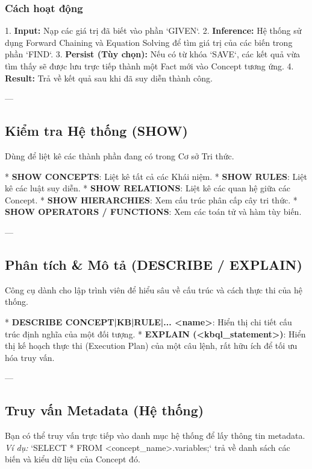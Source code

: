 \subsubsection{Cách hoạt động}
1.  \textbf{Input:} Nạp các giá trị đã biết vào phần `GIVEN`.
2.  \textbf{Inference:} Hệ thống sử dụng Forward Chaining và Equation Solving để tìm giá trị của các biến trong phần `FIND`.
3.  \textbf{Persist (Tùy chọn):} Nếu có từ khóa `SAVE`, các kết quả vừa tìm thấy sẽ được lưu trực tiếp thành một Fact mới vào Concept tương ứng.
4.  \textbf{Result:} Trả về kết quả sau khi đã suy diễn thành công.

---

\subsection{Kiểm tra Hệ thống (SHOW)}

Dùng để liệt kê các thành phần đang có trong Cơ sở Tri thức.

*   \textbf{SHOW CONCEPTS}: Liệt kê tất cả các Khái niệm.
*   \textbf{SHOW RULES}: Liệt kê các luật suy diễn.
*   \textbf{SHOW RELATIONS}: Liệt kê các quan hệ giữa các Concept.
*   \textbf{SHOW HIERARCHIES}: Xem cấu trúc phân cấp cây tri thức.
*   \textbf{SHOW OPERATORS / FUNCTIONS}: Xem các toán tử và hàm tùy biến.

---

\subsection{Phân tích & Mô tả (DESCRIBE / EXPLAIN)}

Công cụ dành cho lập trình viên để hiểu sâu về cấu trúc và cách thực thi của hệ thống.

*   \textbf{DESCRIBE {CONCEPT|KB|RULE|...} <name>}: Hiển thị chi tiết cấu trúc định nghĩa của một đối tượng.
*   \textbf{EXPLAIN (<kbql\_statement>)}: Hiển thị kế hoạch thực thi (Execution Plan) của một câu lệnh, rất hữu ích để tối ưu hóa truy vấn.

---

\subsection{Truy vấn Metadata (Hệ thống)}

Bạn có thể truy vấn trực tiếp vào danh mục hệ thống để lấy thông tin metadata.
\textit{Ví dụ:} `SELECT * FROM <concept\_name>.variables;` trả về danh sách các biến và kiểu dữ liệu của Concept đó.

